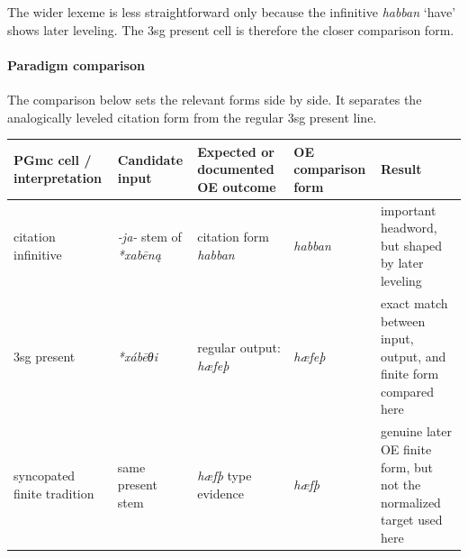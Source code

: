 \documentclass[
  british,
  a4paper,
]{article}
\newcounter{none} %
\begin{document}
The wider lexeme is less straightforward only because the infinitive
{\emph{habban}} `have' shows later leveling. The 3sg present cell is
therefore the closer comparison form.

\paragraph{Paradigm comparison}\label{paradigm-comparison-7}

The comparison below sets the relevant forms side by side. It separates
the analogically leveled citation form from the regular 3sg present
line.

{\def\LTcaptype{none} %
\begin{longtable}[]{@{}
  >{\raggedright\arraybackslash}p{}
  >{\raggedright\arraybackslash}p{}
  >{\raggedright\arraybackslash}p{}
  >{\raggedright\arraybackslash}p{}
  >{\raggedright\arraybackslash}p{}@{}}
\toprule\noalign{}
\begin{minipage}[b]{\linewidth}\raggedright
PGmc cell / interpretation
\end{minipage} & \begin{minipage}[b]{\linewidth}\raggedright
Candidate input
\end{minipage} & \begin{minipage}[b]{\linewidth}\raggedright
Expected or documented OE outcome
\end{minipage} & \begin{minipage}[b]{\linewidth}\raggedright
OE comparison form
\end{minipage} & \begin{minipage}[b]{\linewidth}\raggedright
Result
\end{minipage} \\
\midrule\noalign{}
\endhead
\bottomrule\noalign{}
\endlastfoot
citation infinitive & \emph{-ja-} stem of {\emph{*xabēną}} & citation
form {\emph{habban}} & {\emph{habban}} & important headword, but shaped
by later leveling \\
3sg present & {\emph{*xábēθi}} & regular output: {\emph{hæfeþ}} &
{\emph{hæfeþ}} & exact match between input, output, and finite form
compared here \\
syncopated finite tradition & same present stem & {\emph{hæfþ}} type
evidence & {\emph{hæfþ}} & genuine later OE finite form, but not the
normalized target used here \\
\end{longtable}
}
\end{document}

